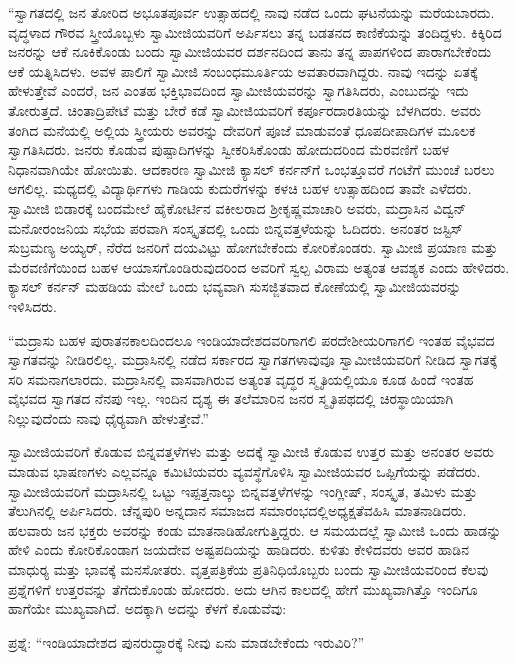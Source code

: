  “ಸ್ವಾಗತದಲ್ಲಿ ಜನ ತೋರಿದ ಅಭೂತಪೂರ್ವ ಉತ್ಸಾಹದಲ್ಲಿ ನಾವು ನಡೆದ ಒಂದು ಘಟನೆಯನ್ನು ಮರೆಯಬಾರದು. ವೃದ್ಧಳಾದ ಗೌರವ ಸ್ತ್ರೀಯೊಬ್ಬಳು ಸ್ವಾಮೀಜಿಯವರಿಗೆ ಅರ್ಪಿಸಲು ತನ್ನ ಬಡತನದ ಕಾಣಿಕೆಯನ್ನು ತಂದಿದ್ದಳು. ಕಿಕ್ಕಿರಿದ ಜನರನ್ನು ಆಕೆ ನೂಕಿಕೊಂಡು ಬಂದು ಸ್ವಾಮೀಜಿಯವರ ದರ್ಶನದಿಂದ ತಾನು ತನ್ನ ಪಾಪಗಳಿಂದ ಪಾರಾಗಬೇಕೆಂದು ಆಕೆ ಯತ್ನಿಸಿದಳು. ಅವಳ ಪಾಲಿಗೆ ಸ್ವಾಮೀಜಿ ಸಂಬಂಧಮೂರ್ತಿಯ ಅವತಾರವಾಗಿದ್ದರು. ನಾವು ಇದನ್ನು ಏತಕ್ಕೆ ಹೇಳುತ್ತೇವೆ ಎಂದರೆ, ಜನ ಎಂತಹ ಭಕ್ತಿಭಾವದಿಂದ ಸ್ವಾಮೀಜಿಯವರನ್ನು ಸ್ವಾಗತಿಸಿದರು, ಎಂಬುದನ್ನು ಇದು ತೋರುತ್ತದೆ. ಚಿಂತಾದ್ರಿಪೇಟೆ ಮತ್ತು ಬೇರೆ ಕಡೆ ಸ್ವಾಮೀಜಿಯವರಿಗೆ ಕರ್ಪೂರದಾರತಿಯನ್ನು ಬೆಳಗಿದರು. ಅವರು ತಂಗಿದ ಮನೆಯಲ್ಲಿ ಅಲ್ಲಿಯ ಸ್ತ್ರೀಯರು ಅವರನ್ನು ದೇವರಿಗೆ ಪೂಜೆ ಮಾಡುವಂತೆ ಧೂಪದೀಪಾದಿಗಳ ಮೂಲಕ ಸ್ವಾಗತಿಸಿದರು. ಜನರು ಕೊಡುವ ಪುಷ್ಪಾದಿಗಳನ್ನು ಸ್ವೀಕರಿಸಿಕೊಂಡು ಹೋದುದರಿಂದ ಮೆರವಣಿಗೆ ಬಹಳ ನಿಧಾನವಾಗಿಯೇ ಹೋಯಿತು. ಆದಕಾರಣ ಸ್ವಾಮೀಜಿ ಕ್ಯಾಸಲ್ ಕರ್ನನ್‍ಗೆ ಒಂಭತ್ತೂವರೆ ಗಂಟೆಗೆ ಮುಂಚೆ ಬರಲು ಆಗಲಿಲ್ಲ. ಮಧ್ಯದಲ್ಲಿ ವಿದ್ಯಾರ್ಥಿಗಳು ಗಾಡಿಯ ಕುದುರೆಗಳನ್ನು ಕಳಚಿ ಬಹಳ ಉತ್ಸಾಹದಿಂದ ತಾವೇ ಎಳೆದರು. ಸ್ವಾಮೀಜಿ ಬಿಡಾರಕ್ಕೆ ಬಂದಮೇಲೆ ಹೈಕೋರ್ಟಿನ ವಕೀಲರಾದ ಶ‍್ರೀಕೃಷ್ಣಮಾಚಾರಿ ಅವರು, ಮದ್ರಾಸಿನ ವಿದ್ವನ್ ಮನೋರಂಜನಿಯ ಸಭೆಯ ಪರವಾಗಿ ಸಂಸ್ಕೃತದಲ್ಲಿ ಒಂದು ಬಿನ್ನವತ್ತಳೆಯನ್ನು ಓದಿದರು. ಅನಂತರ ಜಸ್ಟಿಸ್ ಸುಬ್ರಮಣ್ಯ ಅಯ್ಯರ್, ನೆರೆದ ಜನರಿಗೆ ದಯವಿಟ್ಟು ಹೋಗಬೇಕೆಂದು ಕೋರಿಕೊಂಡರು. ಸ್ವಾಮೀಜಿ ಪ್ರಯಾಣ ಮತ್ತು ಮೆರವಣಿಗೆಯಿಂದ ಬಹಳ ಆಯಾಸಗೊಂಡಿರುವುದರಿಂದ ಅವರಿಗೆ ಸ್ವಲ್ಪ ವಿರಾಮ ಅತ್ಯಂತ ಆವಶ್ಯಕ ಎಂದು ಹೇಳಿದರು. ಕ್ಯಾಸಲ್ ಕರ್ನನ್ ಮಹಡಿಯ ಮೇಲೆ ಒಂದು ಭವ್ಯವಾಗಿ ಸುಸಜ್ಜಿತವಾದ ಕೋಣೆಯಲ್ಲಿ ಸ್ವಾಮೀಜಿಯವರನ್ನು ಇಳಿಸಿದರು. 

 “ಮದ್ರಾಸು ಬಹಳ ಪುರಾತನಕಾಲದಿಂದಲೂ ಇಂಡಿಯಾದೇಶದವರಿಗಾಗಲಿ ಪರದೇಶೀಯರಿಗಾಗಲಿ ಇಂತಹ ವೈಭವದ ಸ್ವಾಗತವನ್ನು ನೀಡಿರಲಿಲ್ಲ. ಮದ್ರಾಸಿನಲ್ಲಿ ನಡೆದ ಸರ್ಕಾರದ ಸ್ವಾಗತಗಳಾವುವೂ ಸ್ವಾಮೀಜಿಯವರಿಗೆ ನೀಡಿದ ಸ್ವಾಗತಕ್ಕೆ ಸರಿ ಸಮನಾಗಲಾರದು. ಮದ್ರಾಸಿನಲ್ಲಿ ವಾಸವಾಗಿರುವ ಅತ್ಯಂತ ವೃದ್ಧರ ಸ್ಮೃತಿಯಲ್ಲಿಯೂ ಕೂಡ ಹಿಂದೆ ಇಂತಹ ವೈಭವದ ಸ್ವಾಗತದ ನೆನಪು ಇಲ್ಲ. ಇಂದಿನ ದೃಶ್ಯ ಈ ತಲೆಮಾರಿನ ಜನರ ಸ್ಮೃತಿಪಥದಲ್ಲಿ ಚಿರಸ್ಥಾಯಿಯಾಗಿ ನಿಲ್ಲುವುದೆಂದು ನಾವು ಧೈರ‍್ಯವಾಗಿ ಹೇಳುತ್ತೇವೆ.” 

 ಸ್ವಾಮೀಜಿಯವರಿಗೆ ಕೊಡುವ ಬಿನ್ನವತ್ತಳೆಗಳು ಮತ್ತು ಅದಕ್ಕೆ ಸ್ವಾಮೀಜಿ ಕೊಡುವ ಉತ್ತರ ಮತ್ತು ಅನಂತರ ಅವರು ಮಾಡುವ ಭಾಷಣಗಳು ಎಲ್ಲವನ್ನೂ ಕಮಿಟಿಯವರು ವ್ಯವಸ್ಥೆಗೊಳಿಸಿ ಸ್ವಾಮೀಜಿಯವರ ಒಪ್ಪಿಗೆಯನ್ನು ಪಡೆದರು. ಸ್ವಾಮೀಜಿಯವರಿಗೆ ಮದ್ರಾಸಿನಲ್ಲಿ ಒಟ್ಟು ಇಪ್ಪತ್ತನಾಲ್ಕು ಬಿನ್ನವತ್ತಳೆಗಳನ್ನು ಇಂಗ್ಲೀಷ್, ಸಂಸ್ಕೃತ, ತಮಿಳು ಮತ್ತು ತೆಲುಗಿನಲ್ಲಿ ಅರ್ಪಿಸಿದರು. ಚೆನ್ನಪುರಿ ಅನ್ನದಾನ ಸಮಾಜದ ಸಮಾರಂಭದಲ್ಲಿ\break ಅಧ್ಯಕ್ಷತೆವಹಿಸಿ ಮಾತನಾಡಿದರು. ಹಲವಾರು ಜನ ಭಕ್ತರು ಅವರನ್ನು ಕಂಡು ಮಾತನಾಡಿಹೋಗುತ್ತಿದ್ದರು. ಆ ಸಮಯದಲ್ಲೆ ಸ್ವಾಮೀಜಿ ಒಂದು ಹಾಡನ್ನು ಹೇಳಿ ಎಂದು ಕೋರಿಕೊಂಡಾಗ ಜಯದೇವ ಅಷ್ಟಪದಿಯನ್ನು ಹಾಡಿದರು. ಕುಳಿತು ಕೇಳಿದವರು ಅವರ ಹಾಡಿನ ಮಾಧುರ‍್ಯ ಮತ್ತು ಭಾವಕ್ಕೆ ಮನಸೋತರು. ವೃತ್ತಪತ್ರಿಕೆಯ ಪ್ರತಿನಿಧಿಯೊಬ್ಬರು ಬಂದು ಸ್ವಾಮೀಜಿಯವರಿಂದ ಕೆಲವು ಪ್ರಶ್ನೆಗಳಿಗೆ ಉತ್ತರವನ್ನು ತೆಗೆದುಕೊಂಡು ಹೋದರು. ಅದು ಆಗಿನ ಕಾಲದಲ್ಲಿ ಹೇಗೆ ಮುಖ್ಯವಾಗಿತ್ತೊ ಇಂದಿಗೂ ಹಾಗೆಯೇ ಮುಖ್ಯವಾಗಿದೆ. ಅದಕ್ಕಾಗಿ ಅದನ್ನು ಕೆಳಗೆ ಕೊಡುವೆವು: 

 ಪ್ರಶ್ನೆ: “ಇಂಡಿಯಾದೇಶದ ಪುನರುದ್ಧಾರಕ್ಕೆ ನೀವು ಏನು ಮಾಡಬೇಕೆಂದು ಇರುವಿರಿ?” 

